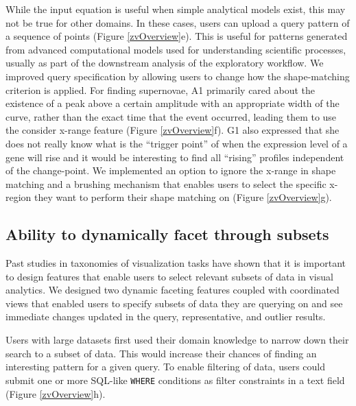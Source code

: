  While the input equation is useful when simple analytical models exist, this may not be true for other domains. In these cases, users can upload a query pattern of a sequence of points (Figure \ref{zvOverview}e). This is useful for patterns generated from advanced computational models used for understanding scientific processes, usually as part of the downstream analysis of the exploratory workflow. %
 We improved query specification by allowing users to change how the shape-matching criterion is applied. For finding supernovae, A1 primarily cared about the existence of a peak above a certain amplitude with an appropriate width of the curve, rather than the exact time that the event occurred, leading them to use the consider x-range feature (Figure \ref{zvOverview}f). G1 also expressed that she does not really know what is the ``trigger point'' of when the expression level of a gene will rise and it would be interesting to find all ``rising'' profiles independent of the change-point.  We implemented an option to ignore the x-range in shape matching and a brushing mechanism that enables users to select the specific x-region they want to perform their shape matching on (Figure \ref{zvOverview}g). 
\subsection{Ability to dynamically facet through subsets}
\par Past studies in taxonomies of visualization tasks have shown that it is important to design features that enable users to select relevant subsets of data in visual analytics\cite{Amar2005,Heer2012}. We designed two dynamic faceting features coupled with coordinated views that enabled users to specify subsets of data they are querying on and see immediate changes updated in the query, representative, and outlier results. 

 Users with large datasets first used their domain knowledge to narrow down their search to a subset of data. This would increase their chances of finding an interesting pattern for a given query. To enable filtering of data, users could submit one or more SQL-like \texttt{WHERE} conditions as filter constraints in a text field (Figure \ref{zvOverview}h).  

